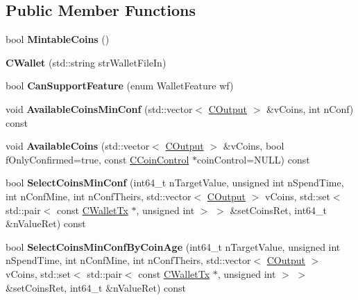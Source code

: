 \subsection*{Public Member Functions}
\begin{DoxyCompactItemize}
\item 
\mbox{\label{class_c_wallet_a7d21c44ded441fedfc3754003ba087ce}} 
bool {\bfseries Mintable\+Coins} ()
\item 
\mbox{\label{class_c_wallet_a43878f79c7bc54f7af0884aa1da07b59}} 
{\bfseries C\+Wallet} (std\+::string str\+Wallet\+File\+In)
\item 
\mbox{\label{class_c_wallet_a83766f3d6797dba08c5ea136fa417c4d}} 
bool {\bfseries Can\+Support\+Feature} (enum Wallet\+Feature wf)
\item 
\mbox{\label{class_c_wallet_a3bdc5f4aadcbecdca0610d7bc3987316}} 
void {\bfseries Available\+Coins\+Min\+Conf} (std\+::vector$<$ \mbox{\hyperlink{class_c_output}{C\+Output}} $>$ \&v\+Coins, int n\+Conf) const
\item 
\mbox{\label{class_c_wallet_a6c5034bf8fe04f46a43bfd7254559dff}} 
void {\bfseries Available\+Coins} (std\+::vector$<$ \mbox{\hyperlink{class_c_output}{C\+Output}} $>$ \&v\+Coins, bool f\+Only\+Confirmed=true, const \mbox{\hyperlink{class_c_coin_control}{C\+Coin\+Control}} $\ast$coin\+Control=N\+U\+LL) const
\item 
\mbox{\label{class_c_wallet_a2c3d3a459f0482b7e7de693e743712eb}} 
bool {\bfseries Select\+Coins\+Min\+Conf} (int64\+\_\+t n\+Target\+Value, unsigned int n\+Spend\+Time, int n\+Conf\+Mine, int n\+Conf\+Theirs, std\+::vector$<$ \mbox{\hyperlink{class_c_output}{C\+Output}} $>$ v\+Coins, std\+::set$<$ std\+::pair$<$ const \mbox{\hyperlink{class_c_wallet_tx}{C\+Wallet\+Tx}} $\ast$, unsigned int $>$ $>$ \&set\+Coins\+Ret, int64\+\_\+t \&n\+Value\+Ret) const
\item 
\mbox{\label{class_c_wallet_a1fce4e041c8a34b24021b704595c9fe5}} 
bool {\bfseries Select\+Coins\+Min\+Conf\+By\+Coin\+Age} (int64\+\_\+t n\+Target\+Value, unsigned int n\+Spend\+Time, int n\+Conf\+Mine, int n\+Conf\+Theirs, std\+::vector$<$ \mbox{\hyperlink{class_c_output}{C\+Output}} $>$ v\+Coins, std\+::set$<$ std\+::pair$<$ const \mbox{\hyperlink{class_c_wallet_tx}{C\+Wallet\+Tx}} $\ast$, unsigned int $>$ $>$ \&set\+Coins\+Ret, int64\+\_\+t \&n\+Value\+Ret) const

\end{DoxyCompactItemize}
